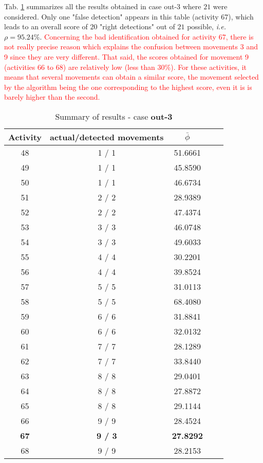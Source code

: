 \documentclass[letterpaper, 10 pt, conference]{ieeeconf}  %
\begin{document}
Tab. \ref{table3} summarizes all the results obtained in case out-3 where $21$ were considered. Only one "false detection" appears in this table (activity 67), which leads to an overall score of $20$ "right detections" out of $21$ possible, \textit{i.e.} $\rho=95.24\%$. \textcolor{red}{Concerning the bad identification obtained for activity 67, there is not really precise reason which explains the confusion between movements 3 and 9 since they are very different. That said, the scores obtained for movement 9 (activities 66 to 68) are relatively low (less than $30\%$). For these activities, it means that several movements can obtain a similar score, the movement selected by the algorithm being the one corresponding to the highest score, even it is is barely higher than the second.}
\begin{table}[h]
\caption{Summary of results - case \textbf{out-3}}
\label{table3}
\begin{center}
\begin{tabular}{|c||c|c|c|c|}
\hline
Activity & actual/detected movements & $\bar{\phi}$\\
\hline
\hline
48&   1 /  1  & 51.6661\\
\hline
   49  &  1  /  1 &  45.8590\\
   \hline
   50  &  1 /   1  & 46.6734\\
   \hline
   51 &   2 /   2 &  28.9389\\
   \hline
   52  &  2  /  2  & 47.4374\\
   \hline
   53  &  3 /   3  & 46.0748\\
   \hline
   54 &   3 /   3 &  49.6033\\
   \hline
   55  &  4  /  4 &  30.2201\\
   \hline
   56 &   4  /  4  & 39.8524\\
   \hline
   57  &  5  /  5  & 31.0113\\
   \hline
   58  &  5  /  5  & 68.4080\\
   \hline
   59  &  6  /  6  & 31.8841\\
   \hline
   60  &  6 /   6 &  32.0132\\
   \hline
   61   & 7  /  7  & 28.1289\\
   \hline
   62  &  7  /  7 &  33.8440\\
   \hline
   63  &  8  /  8  & 29.0401\\
   \hline
   64 &   8 /   8 &  27.8872\\
   \hline
   65  &  8  /  8 &  29.1144\\
   \hline
   66  &  9 /   9  & 28.4524\\
   \hline
   \textbf{67}  &  \textbf{9  /  3 } &  \textbf{27.8292}\\
   \hline
   68  &  9 /   9  & 28.2153\\
   \hline
\end{tabular}
\end{center}
\end{table}
\end{document}
